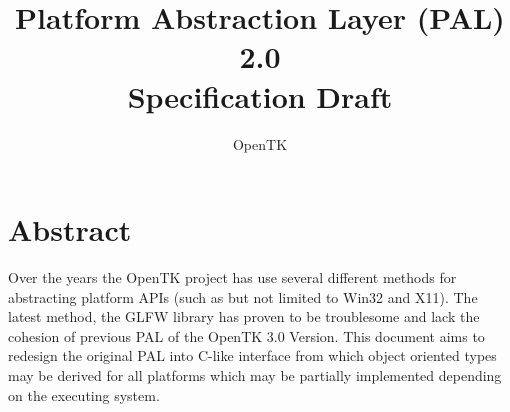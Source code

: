\documentclass[a4paper, 12pt]{article}
\title{
    Platform Abstraction Layer (PAL) 2.0\\
    {\large Specification Draft}
}
\author{OpenTK}
\begin{document}
\maketitle

\section*{Abstract}
Over the years the OpenTK project has use several different methods for
abstracting platform APIs (such as but not limited to Win32 and X11). The latest
method, the GLFW library has proven to be troublesome and lack the cohesion of
previous PAL of the OpenTK 3.0 Version. This document aims to redesign the
original PAL into C-like interface from which object oriented types may be
derived for all platforms which may be partially implemented depending on the
executing system.


\end{document}
